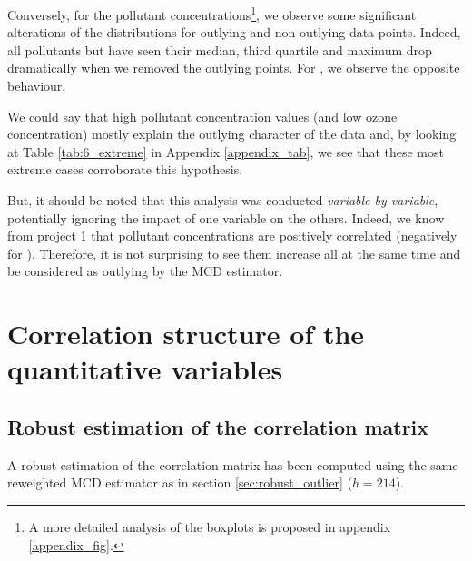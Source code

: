 \documentclass[a4paper, 12pt]{article}
\begin{document}
    Conversely, for the pollutant concentrations\footnote{A more detailed analysis of the boxplots is proposed in appendix \ref{appendix_fig}.}, we observe some significant alterations of the distributions for outlying and non outlying data points. Indeed, all pollutants but  have seen their median, third quartile and maximum drop dramatically when we removed the outlying points. For , we observe the opposite behaviour.

    We could say that high pollutant concentration values (and low ozone concentration) mostly explain the outlying character of the data and, by looking at Table \ref{tab:6_extreme} in Appendix \ref{appendix_tab}, we see that these most extreme cases corroborate this hypothesis.
    
    But, it should be noted that this analysis was conducted \emph{variable by variable}, potentially ignoring the impact of one variable on the others. Indeed, we know from project 1 that pollutant concentrations are positively correlated (negatively for ). Therefore, it is not surprising to see them increase all at the same time and be considered as outlying by the MCD estimator.
    
    \section{Correlation structure of the quantitative variables}
    
    \subsection{Robust estimation of the correlation matrix}
    
    A robust estimation of the correlation matrix has been computed using the same reweighted MCD estimator as in section \ref{sec:robust_outlier} ($h = 214$).
    
\end{document}
